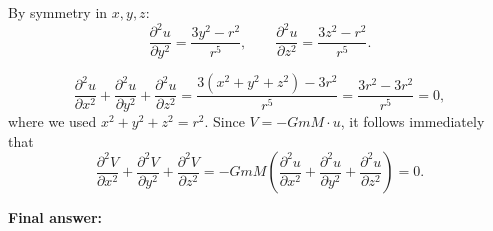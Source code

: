 \begin{respuesta}
By symmetry in $x,y,z$:
\[
\frac{\partial^2 u}{\partial y^2} = \frac{3y^2-r^2}{r^5}, \qquad
\frac{\partial^2 u}{\partial z^2} = \frac{3z^2-r^2}{r^5}.
\]

\[
\frac{\partial^2 u}{\partial x^2}+\frac{\partial^2 u}{\partial y^2}+\frac{\partial^2 u}{\partial z^2}
= \frac{3(x^2+y^2+z^2)-3r^2}{r^5}
= \frac{3r^2 - 3r^2}{r^5}
= 0,
\]
where we used $x^2+y^2+z^2 = r^2$. Since $V = -GmM\cdot u$, it follows immediately that
\[
\frac{\partial^2 V}{\partial x^2}+\frac{\partial^2 V}{\partial y^2}+\frac{\partial^2 V}{\partial z^2}
= -GmM\left(\frac{\partial^2 u}{\partial x^2}+\frac{\partial^2 u}{\partial y^2}+\frac{\partial^2 u}{\partial z^2}\right) = 0.
\]


    \textbf{Final answer:}
    \begin{center}
    \end{center}

\end{respuesta}
